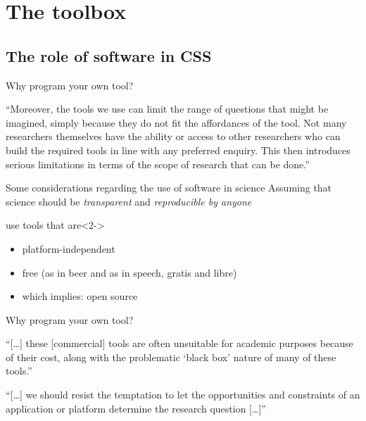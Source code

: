 \documentclass[handout]{beamer}
\begin{document}
\section{The toolbox}
\subsection{The role of software in CSS}



\begin{frame}{Why program your own tool?}
\begin{block}{\textcite{Vis2013}}
``Moreover, the tools we use can limit the range of questions that might be imagined, simply because they do not fit the affordances of the tool. Not many researchers themselves have the ability or access to other researchers who can build the required tools in line with any preferred enquiry. This then introduces serious limitations in terms of the scope of research that can be done.''	
\end{block}

\end{frame}


\begin{frame}{Some considerations regarding the use of software in science}
Assuming that science should be \emph{transparent} and \emph{reproducible by anyone}
\begin{block}{use tools that are}<2->
\begin{itemize}
\item platform-independent 
\item free (as in beer and as in speech, gratis and libre)
\item which implies: open source
\end{itemize}
\end{block}
\end{frame}

\begin{frame}{Why program your own tool?}
\begin{block}{\textcite{Vis2013}}
``{[}\ldots{]} these {[}commercial{]} tools are often unsuitable for academic purposes because of their cost, along with the problematic `black box' nature of many of these tools.''
\end{block}

\begin{block}{\textcite{Mahrt2013}}
``{[}\ldots{]} we should resist the temptation to let the opportunities and constraints of an application or platform determine the research question {[}\ldots{]}''
\end{block}

\end{frame}
\end{document}
